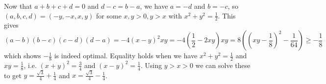 \documentclass[11pt,a4paper]{article}
\begin{document}
	    Now that $a+b+c+d=0$ and $d-c=b-a$, we have $a=-d$ and $b=-c$, 
	    so $(a, b, c, d)=(-y, -x, x, y)$ for some $x, y>0, y>x$ with $x^2+y^2=\frac 12$. 
	    This gives 
	    \[
	    (a-b)(b-c)(c-d)(d-a)
	    =-4(x-y)^2xy
	    =-4\left(\frac 12 - 2xy\right)xy
	    =8\left((xy-\frac 18)^2 - \frac{1}{64}\right)
	    \ge -\frac 18
	    \]
	    which shows $-\frac 18$ is indeed optimal. 
	    Equality holds when we have $x^2+y^2=\frac 12$ and $xy=\frac 18$, 
	    i.e. $(x+y)^2=\frac 34$ and $(x-y)^2=\frac 14$. 
	    Using $y>x>0$ we can solve these to get $y=\frac{\sqrt{3}}{4}+\frac 14$ and 
	    $x=\frac{\sqrt{3}}{4}-\frac 14$. 
	    
\end{document}
